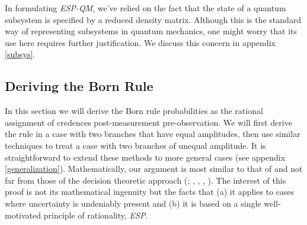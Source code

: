 \documentclass[onecolumn,secnumarabic,amsmath,amssymb,balancelastpage,nofootinbib]{article}
\begin{document}
In formulating \emph{ESP-QM}, we've relied on the fact that the state of a quantum subsystem is specified by a reduced density matrix.  Although this is the standard way of representing subsystems in quantum mechanics, one might worry that its use here requires further justification.  We discuss this concern in appendix \ref{subsys}.

\subsection{Deriving the Born Rule}\label{prf}

In this section we will derive the Born rule probabilities as the rational assignment of credences post-measurement pre-observation.  We will first derive the rule in a case with two branches that have equal amplitudes, then use similar techniques to treat a case with two branches of unequal amplitude.  It is straightforward to extend these methods to more general cases (see appendix \ref{generalization}). Mathematically, our argument is most similar to that of \citet{zurek2005} and not far from those of the decision theoretic approach (\citealp{deutsch1999}; \citeauthor{wallace2003b}, \citeyear{wallace2003b}, \citeyear{wallace2010b}, \citeyear{wallace2012}).  The interest of this proof is not its mathematical ingenuity but the facts that (a) it applies to cases where uncertainty is undeniably present and (b) it is based on a single well-motivated principle of rationality, \emph{ESP}.
\end{document}
